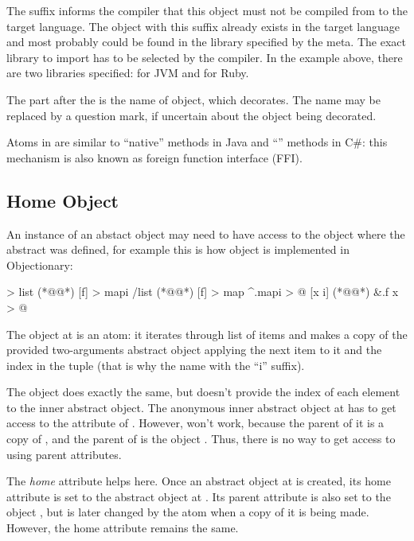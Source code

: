 The  suffix informs the compiler that this object must
not be compiled from \eolang{} to the target language. The object
with this suffix already exists in the target language and most
probably could be found in the library specified by the 
meta. The exact library to import has to be selected by the compiler.
In the example above, there are two libraries specified: for JVM and
for Ruby.

The  part after the \ff{/} is the name of
object, which  decorates. The name may be replaced by
a question mark, if uncertain about the object being decorated.

Atoms in \eolang{} are similar to ``native'' methods in Java and ``'' methods in C\#: this mechanism is also known as foreign function interface (FFI).

\subsection{Home Object}

An instance of an abstact object may need to have access to the
object where the abstract was defined, for example this is
how object  is implemented in Objectionary:

\begin{ffcode}
[] > list (*@\label{ln:list-parent}@*)
  [f] > mapi /list (*@\label{ln:list-map}@*)
  [f] > map
    ^.mapi > @
      [x i] (*@\label{ln:map-inner}@*)
        &.f x > @
\end{ffcode}

The object  at  is an atom:
it iterates through list of items and makes
a copy of the provided two-arguments abstract object  applying the next
item to it and the index in the tuple (that is why the name with the ``i'' suffix).

The object  does exactly the same, but doesn't provide the
index of each element to the inner abstract object.
The anonymous inner abstract object at 
has to get access to the attribute  of .
However,  won't work, because the parent of it is a copy of , and the
parent of  is the object .
Thus, there is no way to get access
to  using parent attributes.

The \emph{home} attribute \ff{\&} helps here.
Once an abstract object at  is created, its
home attribute is set to the abstract object  at .
Its parent attribute \ff{\^{}} is also set to the object ,
but is later changed by the atom  when a copy of it is being made.
However, the home attribute remains the same.
